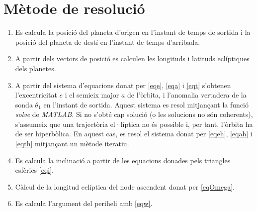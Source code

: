 \section{Mètode de resolució}
\begin{enumerate}
	\item Es calcula la posició del planeta d'origen en l'instant de temps de sortida i la posició del planeta de destí en l'instant de temps d'arribada.
	\item A partir dels vectors de posició es calculen les longituds i latituds eclíptiques dels planetes.
	\item A partir del sistema d'equacions donat per \ref{eqe}, \ref{eqa} i \ref{eqt} s'obtenen l'excentricitat $e$ i el semieix major $a$ de l'òrbita, i l'anomalia vertadera de la sonda $\theta_{1}$ en l'instant de sortida. Aquest sistema es resol mitjançant la funció \textit{solve} de \textit{MATLAB}. Si no s'obté cap solució (o les solucions no són coherents), s'assumeix que una trajectòria el·líptica no és possible i, per tant, l'òrbita ha de ser hiperbòlica. En aquest cas, es resol el sistema donat per \ref{eqeh}, \ref{eqah} i \ref{eqth} mitjançant un mètode iteratiu.
	\item Es calcula la inclinació a partir de les equacions donades pels triangles esfèrics \ref{eqi}.
	\item Càlcul de la longitud eclíptica del node ascendent donat per \ref{eqOmega}.
	\item Es calcula l'argument del periheli amb \ref{eqw}.
\end{enumerate}